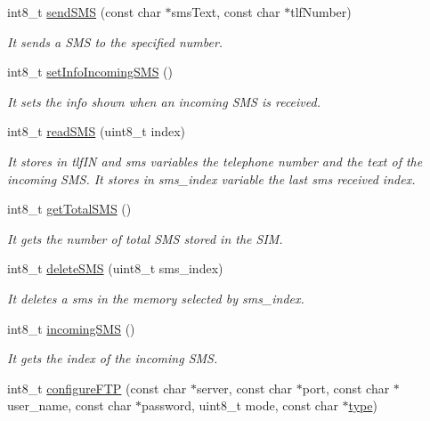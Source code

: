 \begin{DoxyCompactItemize}
int8\+\_\+t \hyperlink{class_wasp3_g_aedf88c00617d303428c236c175b858a3}{send\+S\+MS} (const char $\ast$sms\+Text, const char $\ast$tlf\+Number)
\begin{DoxyCompactList}\small\item\em It sends a S\+MS to the specified number. \end{DoxyCompactList}\item 
int8\+\_\+t \hyperlink{class_wasp3_g_a8a343dd7bcaa58fc9839b82b65f9a066}{set\+Info\+Incoming\+S\+MS} ()
\begin{DoxyCompactList}\small\item\em It sets the info shown when an incoming S\+MS is received. \end{DoxyCompactList}\item 
int8\+\_\+t \hyperlink{class_wasp3_g_aeec0ead049221006d8d972da75289cac}{read\+S\+MS} (uint8\+\_\+t index)
\begin{DoxyCompactList}\small\item\em It stores in \textquotesingle{}tlf\+IN\textquotesingle{} and \textquotesingle{}sms\textquotesingle{} variables the telephone number and the text of the incoming S\+MS. It stores in \textquotesingle{}sms\+\_\+index\textquotesingle{} variable the last sms received index. \end{DoxyCompactList}\item 
int8\+\_\+t \hyperlink{class_wasp3_g_ae1fc61088c64bcd5130af35395c27c08}{get\+Total\+S\+MS} ()
\begin{DoxyCompactList}\small\item\em It gets the number of total S\+MS stored in the S\+IM. \end{DoxyCompactList}\item 
int8\+\_\+t \hyperlink{class_wasp3_g_a0becff490737244381aa58951ec962dc}{delete\+S\+MS} (uint8\+\_\+t sms\+\_\+index)
\begin{DoxyCompactList}\small\item\em It deletes a sms in the memory selected by sms\+\_\+index. \end{DoxyCompactList}\item 
int8\+\_\+t \hyperlink{class_wasp3_g_a43d00903c43ae18483204181d9e7b53e}{incoming\+S\+MS} ()
\begin{DoxyCompactList}\small\item\em It gets the index of the incoming S\+MS. \end{DoxyCompactList}\item 
int8\+\_\+t \hyperlink{class_wasp3_g_a9d67be91d12c3f8c2696fb04b2c3c44f}{configure\+F\+TP} (const char $\ast$server, const char $\ast$port, const char $\ast$user\+\_\+name, const char $\ast$password, uint8\+\_\+t mode, const char $\ast$\hyperlink{_sd_fat_structs_8h_a1d127017fb298b889f4ba24752d08b8e}{type})

\end{DoxyCompactItemize}
